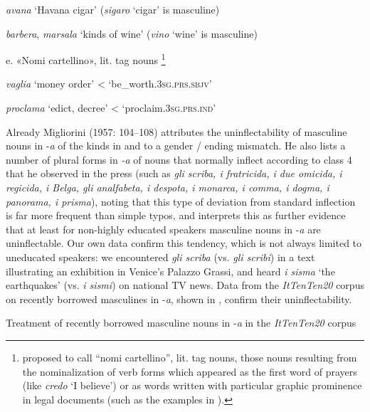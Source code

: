 \documentclass[output=paper]{langscibook}
\begin{document}
\textit{avana} ‘Havana cigar’ (\textit{sigaro} ‘cigar’ is masculine)

\textit{barbera}, \textit{marsala} ‘kinds of wine’ (\textit{vino} ‘wine’ is masculine)

e.  «Nomi cartellino», lit. tag nouns \citep{Migliorini1975}\footnote{\citet{Migliorini1975} proposed to call “nomi cartellino”, lit. tag nouns, those nouns resulting from the nominalization of verb forms which appeared as the first word of prayers (like \textit{credo} ‘I believe’) or as words written with particular graphic prominence in legal documents (such as the examples in ).}

\textit{vaglia} ‘money order’ < ‘be\_worth.\textsc{3sg.prs.sbjv’} 

  \textit{proclama} ‘edict, decree’ < ‘proclaim.\textsc{3sg.prs.ind’}

Already Migliorini (1957: 104–108) attributes the uninflectability of masculine nouns in \nobreakdash-\textit{a} of the kinds in  and  to a gender / ending mismatch. He also lists a number of plural forms in \textit{\nobreakdash-a} of nouns that normally inflect according to class 4 that he observed in the press (such as \textit{gli scriba, i fratricida, i due omicida, i regicida, i Belga, gli analfabeta, i despota, i monarca, i comma, i dogma, i panorama, i prisma}), noting that this type of deviation from standard inflection is far more frequent than simple typos, and interprets this as further evidence that at least for non-highly educated speakers masculine nouns in -\textit{a} are uninflectable. Our own data confirm this tendency, which is not always limited to uneducated speakers: we encountered \textit{gli scriba} (vs. \textit{gli scribi}) in a text illustrating an exhibition in Venice’s Palazzo Grassi, and heard \textit{i sisma} ‘the earthquakes’ (vs. \textit{i sismi}) on national TV news. Data from the \textit{ItTenTen20} corpus on recently borrowed masculines in \nobreakdash-\textit{a}, shown in , confirm their uninflectability.

\begin{stylelsTable}
 Treatment of recently borrowed masculine nouns in \nobreakdash-\textit{a} in the \textit{ItTenTen20} corpus
\end{stylelsTable}
\end{document}
